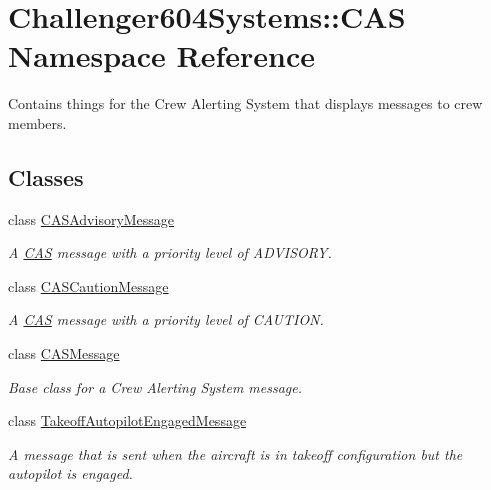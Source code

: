 \hypertarget{namespace_challenger604_systems_1_1_c_a_s}{\section{Challenger604\-Systems\-:\-:C\-A\-S Namespace Reference}
\label{namespace_challenger604_systems_1_1_c_a_s}
}


Contains things for the Crew Alerting System that displays messages to crew members.  


\subsection*{Classes}
\begin{DoxyCompactItemize}
\item 
class \hyperlink{class_challenger604_systems_1_1_c_a_s_1_1_c_a_s_advisory_message}{C\-A\-S\-Advisory\-Message}
\begin{DoxyCompactList}\small\item\em A \hyperlink{namespace_challenger604_systems_1_1_c_a_s}{C\-A\-S} message with a priority level of A\-D\-V\-I\-S\-O\-R\-Y. \end{DoxyCompactList}\item 
class \hyperlink{class_challenger604_systems_1_1_c_a_s_1_1_c_a_s_caution_message}{C\-A\-S\-Caution\-Message}
\begin{DoxyCompactList}\small\item\em A \hyperlink{namespace_challenger604_systems_1_1_c_a_s}{C\-A\-S} message with a priority level of C\-A\-U\-T\-I\-O\-N. \end{DoxyCompactList}\item 
class \hyperlink{class_challenger604_systems_1_1_c_a_s_1_1_c_a_s_message}{C\-A\-S\-Message}
\begin{DoxyCompactList}\small\item\em Base class for a Crew Alerting System message. \end{DoxyCompactList}\item 
class \hyperlink{class_challenger604_systems_1_1_c_a_s_1_1_takeoff_autopilot_engaged_message}{Takeoff\-Autopilot\-Engaged\-Message}
\begin{DoxyCompactList}\small\item\em A message that is sent when the aircraft is in takeoff configuration but the autopilot is engaged. \end{DoxyCompactList}\item 

\end{DoxyCompactItemize}
